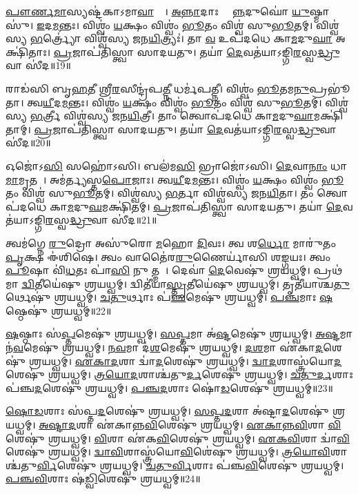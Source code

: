    \ul{𑌪𑍗}\ul{𑌰𑍍𑌣}\ul{𑌮𑌾}𑌸𑍍𑌯𑌷𑍍𑌟॑𑌕𑌾𑌽𑌮𑌾\ul{𑌵𑌾}𑌸𑍍𑌯𑌾᳚।
   \ul{𑌅}\ul{𑌨𑍍𑌨𑌾}𑌦𑌾𑌃 𑌸𑍍𑌥𑌾᳚\ul{𑌨𑍍𑌨}𑌦𑍁𑌘𑍋॑ \ul{𑌯𑍁}𑌷𑍍𑌮𑌾𑌸𑍁॑। 
   \ul{𑌇}𑌦\ul{𑌮}𑌨𑍍𑌤𑌃।
   𑌵𑌿𑌶𑍍𑌵𑌂॑ \ul{𑌯}𑌕𑍍𑌷𑌂 𑌵𑌿𑌶𑍍𑌵𑌂॑ \ul{𑌭𑍂}𑌤𑌂 𑌵𑌿𑌶𑍍𑌵॑ 𑌸𑍁\ul{𑌭𑍂}𑌤𑌮𑍍।
   𑌵𑌿𑌶𑍍𑌵॑𑌸𑍍𑌯 \ul{𑌭}𑌰𑍍𑌤𑍍𑌰𑍍𑌯𑍋॑ 𑌵𑌿𑌶𑍍𑌵॑𑌸𑍍𑌯 𑌜𑌨\ul{𑌯𑌿}𑌤𑍍𑌰𑍍𑌯𑌃॑।
   𑌤𑌾 \ul{𑌵} 𑌉𑌪॑𑌦𑌧𑍇 𑌕𑌾\ul{𑌮}𑌦𑍁\ul{𑌘𑌾} 𑌅𑌕𑍍𑌷𑌿॑𑌤𑌾𑌃।
   \ul{𑌪𑍍𑌰}𑌜𑌾𑌪॑𑌤𑌿𑌸𑍍𑌤𑍍𑌵𑌾 𑌸𑌾𑌦𑌯𑌤𑍁।
   𑌤𑌯𑌾॑ \ul{𑌦𑍇}𑌵𑌤॑𑌯𑌾𑌽𑌙𑍍𑌗𑌿\ul{𑌰}𑌸𑍍𑌵\ul{𑌦𑍍𑌧𑍍𑌰𑍁}𑌵𑌾 𑌸𑍀॑𑌦॥19॥

   𑌰𑌾𑌡॑𑌸𑌿 𑌬𑍃\ul{𑌹}𑌤𑍀 𑌶𑍍𑌰𑍀\ul{𑌰}𑌸𑍀𑌨𑍍𑌦𑍍𑌰॑𑌪\ul{𑌤𑍍𑌨𑍀} 𑌧𑌰𑍍𑌮॑𑌪𑌤𑍍𑌨𑍀।
   𑌵𑌿𑌶𑍍𑌵𑌂॑ \ul{𑌭𑍂}𑌤𑌮\ul{𑌨𑍁}𑌪𑍍𑌰𑌭𑍂॑𑌤𑌾।
   𑌤𑍍𑌵\ul{𑌯𑍀}𑌦\ul{𑌮}𑌨𑍍𑌤𑌃।
   𑌵𑌿𑌶𑍍𑌵𑌂॑ \ul{𑌯}𑌕𑍍𑌷𑌂 𑌵𑌿𑌶𑍍𑌵𑌂॑ \ul{𑌭𑍂}𑌤𑌂 𑌵𑌿𑌶𑍍𑌵॑ 𑌸𑍁\ul{𑌭𑍂}𑌤𑌮𑍍।
   𑌵𑌿𑌶𑍍𑌵॑𑌸𑍍𑌯 \ul{𑌭}𑌰𑍍𑌤𑍍𑌰𑍀 𑌵𑌿𑌶𑍍𑌵॑𑌸𑍍𑌯 𑌜𑌨\ul{𑌯𑌿}𑌤𑍍𑌰𑍀।
   𑌤𑌾𑌂 𑌤𑍍𑌵𑍋𑌪॑𑌦𑌧𑍇 𑌕𑌾\ul{𑌮}𑌦𑍁\ul{𑌘𑌾}𑌮𑌕𑍍𑌷𑌿॑𑌤𑌾𑌮𑍍।
   \ul{𑌪𑍍𑌰}𑌜𑌾𑌪॑𑌤𑌿𑌸𑍍𑌤𑍍𑌵𑌾 𑌸𑌾𑌦𑌯𑌤𑍁।
   𑌤𑌯𑌾॑ \ul{𑌦𑍇}𑌵𑌤॑𑌯𑌾𑌽𑌙𑍍𑌗𑌿\ul{𑌰}𑌸𑍍𑌵\ul{𑌦𑍍𑌧𑍍𑌰𑍁}𑌵𑌾 𑌸𑍀॑𑌦॥20॥

   𑌓𑌜𑍋॑𑌽\ul{𑌸𑌿} 𑌸𑌹𑍋॑𑌽𑌸𑌿।
   𑌬𑌲॑𑌮\ul{𑌸𑌿} 𑌭𑍍𑌰𑌾𑌜𑍋॑𑌽𑌸𑌿।
   \ul{𑌦𑍇}𑌵𑌾\ul{𑌨𑌾𑌂} 𑌧𑌾\ul{𑌮𑌾}𑌮𑍃𑌤𑌮𑍍᳚।
   𑌅𑌮॑𑌰𑍍𑌤𑍍𑌯𑌸𑍍𑌤\ul{𑌪𑍋}𑌜𑌾𑌃।
   𑌤𑍍𑌵\ul{𑌯𑍀}𑌦\ul{𑌮}𑌨𑍍𑌤𑌃।
   𑌵𑌿𑌶𑍍𑌵𑌂॑ \ul{𑌯}𑌕𑍍𑌷𑌂 𑌵𑌿𑌶𑍍𑌵𑌂॑ \ul{𑌭𑍂}𑌤𑌂 𑌵𑌿𑌶𑍍𑌵॑ 𑌸𑍁\ul{𑌭𑍂}𑌤𑌮𑍍।
   𑌵𑌿𑌶𑍍𑌵॑𑌸𑍍𑌯 \ul{𑌭}𑌰𑍍𑌤𑌾 𑌵𑌿𑌶𑍍𑌵॑𑌸𑍍𑌯 𑌜𑌨\ul{𑌯𑌿}𑌤𑌾।
   𑌤𑌂 𑌤𑍍𑌵𑍋𑌪॑𑌦𑌧𑍇 𑌕𑌾\ul{𑌮}𑌦𑍁\ul{𑌘}𑌮𑌕𑍍𑌷𑌿॑𑌤𑌮𑍍।
   \ul{𑌪𑍍𑌰}𑌜𑌾𑌪॑𑌤𑌿𑌸𑍍𑌤𑍍𑌵𑌾 𑌸𑌾𑌦𑌯𑌤𑍁।
   𑌤𑌯𑌾॑ \ul{𑌦𑍇}𑌵𑌤॑𑌯𑌾𑌽𑌙𑍍𑌗𑌿\ul{𑌰}𑌸𑍍𑌵\ul{𑌦𑍍𑌧𑍍𑌰𑍁}𑌵𑌾 𑌸𑍀॑𑌦॥21॥
\anuvakamend

   𑌤𑍍𑌵𑌮॑𑌗𑍍𑌨𑍇 \ul{𑌰𑍁}𑌦𑍍𑌰𑍋 𑌅𑌸𑍁॑𑌰𑍋 \ul{𑌮}𑌹𑍋 \ul{𑌦𑌿}𑌵𑌃।
   𑌤𑍍𑌵 𑌶\ul{𑌰𑍍𑌧𑍋} 𑌮𑌾𑌰𑍁॑𑌤𑌂 \ul{𑌪𑍃}𑌕𑍍𑌷 𑌈॑𑌶𑌿𑌷𑍇।
   𑌤𑍍𑌵𑌂 𑌵𑌾𑌤𑍈॑𑌰\ul{𑌰𑍁}𑌣𑍈𑌰𑍍𑌯𑌾॑𑌸𑌿 𑌶\ul{𑌙𑍍𑌗}𑌯𑌃।
   𑌤𑍍𑌵𑌂 \ul{𑌪𑍂}𑌷𑌾 𑌵𑌿॑\ul{𑌧}𑌤𑌃 𑌪𑌾॑\ul{𑌸𑌿} 𑌨𑍁 𑌤𑍍𑌮𑌨𑌾᳚।
   𑌦𑍇𑌵𑌾॑ \ul{𑌦𑍇}𑌵𑍇𑌷𑍁॑ 𑌶𑍍𑌰𑌯𑌧𑍍𑌵𑌮𑍍।
   𑌪𑍍𑌰𑌥॑𑌮𑌾 \ul{𑌦𑍍𑌵𑌿}𑌤𑍀𑌯𑍇॑𑌷𑍁 𑌶𑍍𑌰𑌯𑌧𑍍𑌵𑌮𑍍।
   𑌦𑍍𑌵𑌿𑌤𑍀॑𑌯𑌾\ul{𑌸𑍍𑌤𑍃}𑌤𑍀𑌯𑍇॑𑌷𑍁 𑌶𑍍𑌰𑌯𑌧𑍍𑌵𑌮𑍍।
   𑌤𑍃𑌤𑍀॑𑌯𑌾𑌶𑍍𑌚\ul{𑌤𑍁}𑌰𑍍𑌥𑍇𑌷𑍁॑ 𑌶𑍍𑌰𑌯𑌧𑍍𑌵𑌮𑍍।
   \ul{𑌚}\ul{𑌤𑍁}𑌰𑍍𑌥𑌾𑌃 𑌪॑\ul{𑌞𑍍𑌚}𑌮𑍇𑌷𑍁॑ 𑌶𑍍𑌰𑌯𑌧𑍍𑌵𑌮𑍍।
   \ul{𑌪}\ul{𑌞𑍍𑌚}𑌮𑌾𑌃 \ul{𑌷}𑌷𑍍𑌠𑍇𑌷𑍁॑ 𑌶𑍍𑌰𑌯𑌧𑍍𑌵𑌮𑍍॥22॥

   \ul{𑌷}𑌷𑍍𑌠𑌾𑌃 𑌸॑\ul{𑌪𑍍𑌤}𑌮𑍇𑌷𑍁॑ 𑌶𑍍𑌰𑌯𑌧𑍍𑌵𑌮𑍍।
   \ul{𑌸}\ul{𑌪𑍍𑌤}𑌮𑌾 𑌅॑\ul{𑌷𑍍𑌟}𑌮𑍇𑌷𑍁॑ 𑌶𑍍𑌰𑌯𑌧𑍍𑌵𑌮𑍍।
   \ul{𑌅}\ul{𑌷𑍍𑌟}𑌮𑌾 𑌨॑\ul{𑌵}𑌮𑍇𑌷𑍁॑ 𑌶𑍍𑌰𑌯𑌧𑍍𑌵𑌮𑍍।
   \ul{𑌨}\ul{𑌵}𑌮𑌾 𑌦॑\ul{𑌶}𑌮𑍇𑌷𑍁॑ 𑌶𑍍𑌰𑌯𑌧𑍍𑌵𑌮𑍍।
   \ul{𑌦}\ul{𑌶}𑌮𑌾 𑌏॑𑌕𑌾\ul{𑌦}𑌶𑍇𑌷𑍁॑ 𑌶𑍍𑌰𑌯𑌧𑍍𑌵𑌮𑍍।
   \ul{𑌏}\ul{𑌕𑌾}\ul{𑌦}𑌶𑌾 𑌦𑍍𑌵𑌾॑\ul{𑌦}𑌶𑍇𑌷𑍁॑ 𑌶𑍍𑌰𑌯𑌧𑍍𑌵𑌮𑍍।
   \ul{𑌦𑍍𑌵𑌾}\ul{𑌦}𑌶𑌾𑌸𑍍𑌤𑍍𑌰॑𑌯𑍋\ul{𑌦}𑌶𑍇𑌷𑍁॑ 𑌶𑍍𑌰𑌯𑌧𑍍𑌵𑌮𑍍।
   \ul{𑌤𑍍𑌰}\ul{𑌯𑍋}\ul{𑌦}𑌶𑌾𑌶𑍍𑌚॑𑌤𑍁\ul{𑌰𑍍𑌦}𑌶𑍇𑌷𑍁॑ 𑌶𑍍𑌰𑌯𑌧𑍍𑌵𑌮𑍍।
   \ul{𑌚}\ul{𑌤𑍁}\ul{𑌰𑍍𑌦}𑌶𑌾𑌃 𑌪॑𑌞𑍍𑌚\ul{𑌦}𑌶𑍇𑌷𑍁॑ 𑌶𑍍𑌰𑌯𑌧𑍍𑌵𑌮𑍍।
   \ul{𑌪}\ul{𑌞𑍍𑌚}\ul{𑌦}𑌶𑌾𑌃 𑌷𑍋॑\ul{𑌡}𑌶𑍇𑌷𑍁॑ 𑌶𑍍𑌰𑌯𑌧𑍍𑌵𑌮𑍍॥23॥

   \ul{𑌷𑍋}\ul{𑌡}𑌶𑌾𑌃 𑌸॑𑌪𑍍𑌤\ul{𑌦}𑌶𑍇𑌷𑍁॑ 𑌶𑍍𑌰𑌯𑌧𑍍𑌵𑌮𑍍।
   \ul{𑌸}\ul{𑌪𑍍𑌤}\ul{𑌦}𑌶𑌾 𑌅॑𑌷𑍍𑌟𑌾\ul{𑌦}𑌶𑍇𑌷𑍁॑ 𑌶𑍍𑌰𑌯𑌧𑍍𑌵𑌮𑍍।
   \ul{𑌅}\ul{𑌷𑍍𑌟𑌾}\ul{𑌦}𑌶𑌾 𑌏॑𑌕𑌾𑌨𑍍𑌨\ul{𑌵𑌿}\ul{}𑌶𑍇𑌷𑍁॑ 𑌶𑍍𑌰𑌯𑌧𑍍𑌵𑌮𑍍।
   \ul{𑌏}\ul{𑌕𑌾}\ul{𑌨𑍍𑌨}\ul{𑌵𑌿}\ul{}𑌶𑌾 \ul{𑌵𑌿}\ul{}𑌶𑍇𑌷𑍁॑ 𑌶𑍍𑌰𑌯𑌧𑍍𑌵𑌮𑍍।
   \ul{𑌵𑌿}\ul{}𑌶𑌾 𑌏॑𑌕\ul{𑌵𑌿}\ul{}𑌶𑍇𑌷𑍁॑ 𑌶𑍍𑌰𑌯𑌧𑍍𑌵𑌮𑍍।
   \ul{𑌏}\ul{𑌕}\ul{𑌵𑌿}\ul{}𑌶𑌾 𑌦𑍍𑌵𑌾॑\ul{𑌵𑌿}\ul{}𑌶𑍇𑌷𑍁॑ 𑌶𑍍𑌰𑌯𑌧𑍍𑌵𑌮𑍍।
   \ul{𑌦𑍍𑌵𑌾}\ul{𑌵𑌿}\ul{}𑌶𑌾𑌸𑍍𑌤𑍍𑌰॑𑌯𑍋\ul{𑌵𑌿}\ul{}𑌶𑍇॑𑌷𑍁 𑌶𑍍𑌰𑌯𑌧𑍍𑌵𑌮𑍍।
   \ul{𑌤𑍍𑌰}\ul{𑌯𑍋}\ul{𑌵𑌿}\ul{}𑌶𑌾𑌶𑍍𑌚॑𑌤𑍁\ul{𑌰𑍍𑌵𑌿}\ul{}𑌶𑍇𑌷𑍁॑ 𑌶𑍍𑌰𑌯𑌧𑍍𑌵𑌮𑍍।
   \ul{𑌚}\ul{𑌤𑍁}\ul{𑌰𑍍𑌵𑌿}\ul{}𑌶𑌾𑌃 𑌪॑𑌞𑍍𑌚\ul{𑌵𑌿}\ul{}𑌶𑍇𑌷𑍁॑ 𑌶𑍍𑌰𑌯𑌧𑍍𑌵𑌮𑍍।
   \ul{𑌪}\ul{𑌞𑍍𑌚}\ul{𑌵𑌿}\ul{}𑌶𑌾𑌃 𑌷॑\ul{𑌡𑍍𑌵𑌿}\ul{}𑌶𑍇𑌷𑍁॑ 𑌶𑍍𑌰𑌯𑌧𑍍𑌵𑌮𑍍॥24॥

